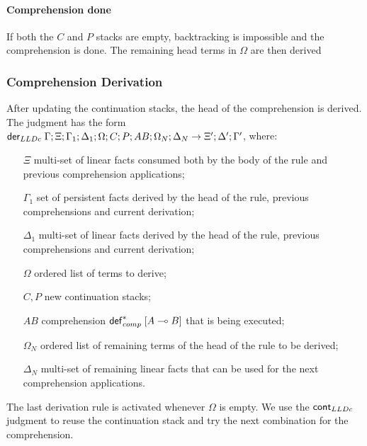 

\paragraph{Comprehension done}

If both the $C$ and $P$ stacks are empty, backtracking is impossible and the
comprehension is done. The remaining head terms in $\Omega$ are then derived



\subsubsection{Comprehension Derivation}

After updating the continuation stacks, the head of the comprehension is
derived. The judgment has the form $\mathsf{der}_{LLDc} \; \Gamma; \Xi; \Gamma_1; \Delta_1; \Omega;
C; P; AB; \Omega_N; \Delta_N \rightarrow \Xi'; \Delta'; \Gamma'$, where:

\begin{enumerate}
   \item[$\Xi$] multi-set of linear facts consumed both by the body of the rule
   and previous comprehension applications;
   \item[$\Gamma_1$] set of persistent facts derived by the head of the rule,
   previous comprehensions and current derivation;
   \item[$\Delta_1$] multi-set of linear facts derived by the head of the rule,
   previous comprehensions and current derivation;
   \item[$\Omega$] ordered list of terms to derive;
   \item[$C, P$] new continuation stacks;
   \item[$AB$] comprehension $\mathsf{def}_{comp}^{*} \; [A \multimap B]$ that is being executed;
   \item[$\Omega_N$] ordered list of remaining terms of the head of the rule to
   be derived;
   \item[$\Delta_N$] multi-set of remaining linear facts that can be used for
   the next comprehension applications.
\end{enumerate}



The last derivation rule is activated whenever $\Omega$ is empty. We use the $\mathsf{cont}_{LLDc} \;$judgment to reuse the continuation stack
and try the next combination for the comprehension.


